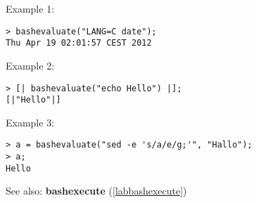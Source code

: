 \noindent Example 1: 
\begin{center}\begin{minipage}{15cm}\begin{Verbatim}[frame=single]
> bashevaluate("LANG=C date");
Thu Apr 19 02:01:57 CEST 2012
\end{Verbatim}
\end{minipage}\end{center}
\noindent Example 2: 
\begin{center}\begin{minipage}{15cm}\begin{Verbatim}[frame=single]
> [| bashevaluate("echo Hello") |];
[|"Hello"|]
\end{Verbatim}
\end{minipage}\end{center}
\noindent Example 3: 
\begin{center}\begin{minipage}{15cm}\begin{Verbatim}[frame=single]
> a = bashevaluate("sed -e 's/a/e/g;'", "Hallo");
> a;
Hello
\end{Verbatim}
\end{minipage}\end{center}
See also: \textbf{bashexecute} (\ref{labbashexecute})
